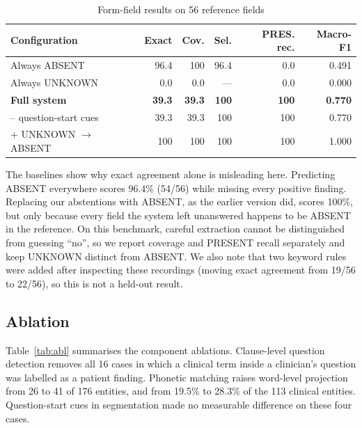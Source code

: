 \documentclass[conference]{IEEEtran}
\begin{document}
\begin{table}[!t]
\centering\footnotesize
\caption{Form-field results on 56 reference fields}\label{tab:form}
\begin{tabular}{lrrrrr}
\toprule
\textbf{Configuration} & \textbf{Exact} & \textbf{Cov.} & \textbf{Sel.} & \textbf{PRES. rec.} & \textbf{Macro-F1} \\
\midrule
Always ABSENT & 96.4 & 100 & 96.4 & 0.0 & 0.491 \\
Always UNKNOWN & 0.0 & 0.0 & — & 0.0 & 0.000 \\
\textbf{Full system} & \textbf{39.3} & \textbf{39.3} & \textbf{100} & \textbf{100} & \textbf{0.770} \\
– question-start cues & 39.3 & 39.3 & 100 & 100 & 0.770 \\
+ UNKNOWN $\rightarrow$ ABSENT & 100 & 100 & 100 & 100 & 1.000 \\
\bottomrule
\end{tabular}
\end{table}

The baselines show why exact agreement alone is misleading here. Predicting ABSENT everywhere scores 96.4\% (54/56) while missing every positive finding. Replacing our abstentions with ABSENT, as the earlier version did, scores 100\%, but only because every field the system left unanswered happens to be ABSENT in the reference. On this benchmark, careful extraction cannot be distinguished from guessing “no”, so we report coverage and PRESENT recall separately and keep UNKNOWN distinct from ABSENT. We also note that two keyword rules were added after inspecting these recordings (moving exact agreement from 19/56 to 22/56), so this is not a held-out result.

\subsection{Ablation}
Table~\ref{tab:abl} summarises the component ablations. Clause-level question detection removes all 16 cases in which a clinical term inside a clinician's question was labelled as a patient finding. Phonetic matching raises word-level projection from 26 to 41 of 176 entities, and from 19.5\% to 28.3\% of the 113 clinical entities. Question-start cues in segmentation made no measurable difference on these four cases.
\end{document}
